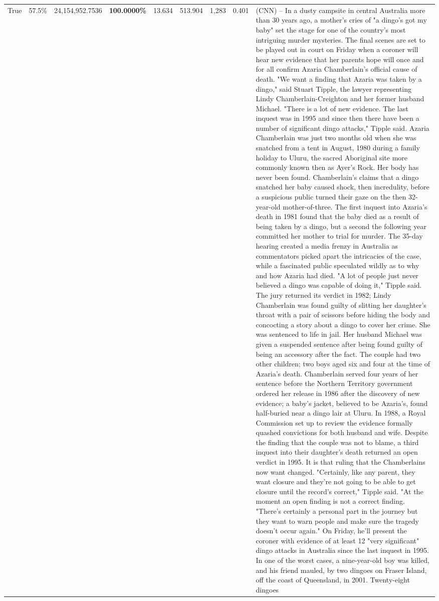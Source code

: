 \begin{table}[H]
\begin{tabular}{lllrlllll}
True & 57.5\% & 24,154,952.7536 & \bfseries \color{red} 100.0000\% & 13.634 & 513.904 & 1,283 & 0.401 & (CNN) -- In a dusty campsite in central Australia more than 30 years ago, a mother's cries of "a dingo's got my baby" set the stage for one of the country's most intriguing murder mysteries. The final scenes are set to be played out in court on Friday when a coroner will hear new evidence that her parents hope will once and for all confirm Azaria Chamberlain's official cause of death. "We want a finding that Azaria was taken by a dingo," said Stuart Tipple, the lawyer representing Lindy Chamberlain-Creighton and her former husband Michael. "There is a lot of new evidence. The last inquest was in 1995 and since then there have been a number of significant dingo attacks," Tipple said. Azaria Chamberlain was just two months old when she was snatched from a tent in August, 1980 during a family holiday to Uluru, the sacred Aboriginal site more commonly known then as Ayer's Rock. Her body has never been found. Chamberlain's claims that a dingo snatched her baby caused shock, then incredulity, before a suspicious public turned their gaze on the then 32-year-old mother-of-three. The first inquest into Azaria's death in 1981 found that the baby died as a result of being taken by a dingo, but a second the following year committed her mother to trial for murder. The 35-day hearing created a media frenzy in Australia as commentators picked apart the intricacies of the case, while a fascinated public speculated wildly as to why and how Azaria had died. "A lot of people just never believed a dingo was capable of doing it," Tipple said. The jury returned its verdict in 1982; Lindy Chamberlain was found guilty of slitting her daughter's throat with a pair of scissors before hiding the body and concocting a story about a dingo to cover her crime. She was sentenced to life in jail. Her husband Michael was given a suspended sentence after being found guilty of being an accessory after the fact. The couple had two other children; two boys aged six and four at the time of Azaria's death. Chamberlain served four years of her sentence before the Northern Territory government ordered her release in 1986 after the discovery of new evidence; a baby's jacket, believed to be Azaria's, found half-buried near a dingo lair at Uluru. In 1988, a Royal Commission set up to review the evidence formally quashed convictions for both husband and wife. Despite the finding that the couple was not to blame, a third inquest into their daughter's death returned an open verdict in 1995. It is that ruling that the Chamberlains now want changed. "Certainly, like any parent, they want closure and they're not going to be able to get closure until the record's correct," Tipple said. "At the moment an open finding is not a correct finding. "There's certainly a personal part in the journey but they want to warn people and make sure the tragedy doesn't occur again." On Friday, he'll present the coroner with evidence of at least 12 "very significant" dingo attacks in Australia since the last inquest in 1995. In one of the worst cases, a nine-year-old boy was killed, and his friend mauled, by two dingoes on Fraser Island, off the coast of Queensland, in 2001. Twenty-eight dingoes 
\end{tabular}
\end{table}
